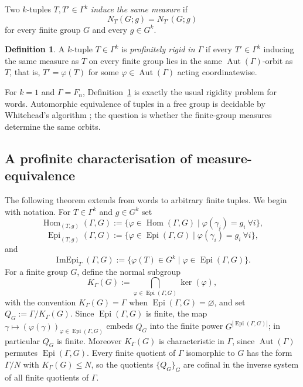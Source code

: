 \documentclass[11pt]{amsart}
\theoremstyle{plain}
\theoremstyle{definition}
\newtheorem{definition}[theorem]{Definition}
\newcommand{\Hom}{\operatorname{Hom}}
\newcommand{\Epi}{\operatorname{Epi}}
\newcommand{\Aut}{\operatorname{Aut}}
\newcommand{\ImEpi}{\operatorname{ImEpi}}
\begin{document}
Two $k$-tuples $T,T'\in\Gamma^{k}$ \emph{induce the same measure} if
\[
  N_T(G;g)=N_{T'}(G;g)
\]
for every finite group $G$ and every $g\in G^{k}$.

\begin{definition}\label{def:tuple-rigid}
A $k$-tuple $T\in\Gamma^{k}$ is \emph{profinitely rigid in $\Gamma$} if every
$T'\in\Gamma^{k}$ inducing the same measure as $T$ on every finite group lies in
the same $\Aut(\Gamma)$-orbit as $T$, that is, $T'=\varphi(T)$ for some
$\varphi\in\Aut(\Gamma)$ acting coordinatewise.
\end{definition}

For $k=1$ and $\Gamma=F_n$, Definition~\ref{def:tuple-rigid} is exactly the
usual rigidity problem for words.  Automorphic equivalence of tuples in a free
group is decidable by Whitehead's algorithm \cite{Whitehead}; the question is
whether the finite-group measures determine the same orbits.


\subsection{A profinite characterisation of measure-equivalence}
\label{sec:tuple-char}


The following theorem extends \cite[Theorem 2.2]{HMP} from words to arbitrary
finite tuples.  We begin with notation.  For $T\in\Gamma^{k}$ and $g\in G^{k}$ set
\[
  \Hom_{(T,g)}(\Gamma,G):=\{\varphi\in\Hom(\Gamma,G)\mid\varphi(\gamma_i)=g_i\ \forall i\},
\]
\[
  \Epi_{(T,g)}(\Gamma,G):=\{\varphi\in\Epi(\Gamma,G)\mid\varphi(\gamma_i)=g_i\ \forall i\},
\]
and
\[
  \ImEpi_T(\Gamma,G):=\{\varphi(T)\in G^{k}\mid\varphi\in\Epi(\Gamma,G)\}.
\]
For a finite group $G$, define the normal subgroup
\[
  K_\Gamma(G):=\bigcap_{\varphi\in\Epi(\Gamma,G)}\ker(\varphi),
\]
with the convention $K_\Gamma(G)=\Gamma$ when $\Epi(\Gamma,G)=\varnothing$, and
set $Q_G:=\Gamma/K_\Gamma(G)$.  Since $\Epi(\Gamma,G)$ is finite, the map
$\gamma\mapsto(\varphi(\gamma))_{\varphi\in\Epi(\Gamma,G)}$ embeds $Q_G$ into the
finite power $G^{|\Epi(\Gamma,G)|}$; in particular $Q_G$ is finite.  Moreover
$K_\Gamma(G)$ is characteristic in $\Gamma$, since $\Aut(\Gamma)$ permutes
$\Epi(\Gamma,G)$.  Every finite quotient of $\Gamma$ isomorphic to $G$ has the
form $\Gamma/N$ with $K_\Gamma(G)\le N$, so the quotients $\{Q_G\}_G$ are
cofinal in the inverse system of all finite quotients of $\Gamma$.
\end{document}
